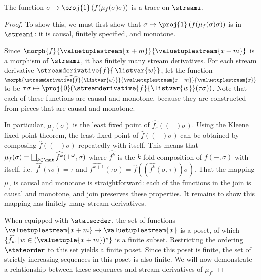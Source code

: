 \begin{proposition}
    The function \(\sigma \mapsto \proj{1}\left(f(\mu_f(\sigma)\sigma)\right)\)
    is a trace on \(\streami\).
\end{proposition}
\begin{proof}
    To show this, we must first show that
    \(\sigma \mapsto \proj{1}\left(f(\mu_f(\sigma)\sigma)\right)\) is in
    \(\streami\): it is causal, finitely specified, and monotone.

    Since \(
    \morph{f}{\valuetuplestream{x+m}}{\valuetuplestream{x+m}}
    \) is a morphism of \(\streami\), it has finitely many stream derivatives.
    For each stream derivative \(\streamderivative{f}{\,\listvar{w}}\), let the
    function \(
    \morph{
        \widehat{\streamderivative{f}{\listvar{w}}}
    }{
        \valuetuplestream{x+m}
    }{
        \valuetuplestream{x}
    }
    \) to be \(
    \tau\sigma
    \mapsto
    \proj{0}(\streamderivative{f}{\listvar{w}}(\tau\sigma))
    \).
    Note that each of these functions are causal and monotone, because they are
    constructed from pieces that are causal and monotone.

    In particular, \(\mu_f(\sigma)\) is the least fixed point of
    \(\widehat{f_\varepsilon}\left((-)\sigma\right)\).
    Using the Kleene fixed point theorem, the least fixed point of
    \(\widehat{f}((-)\sigma)\) can be obtained by composing
    \(\widehat{f}((-)\sigma)\) repeatedly with itself.
    This means that \(
    \mu_f(\sigma)
    =
    \bigsqcup_{k \in \nat} \widehat{f^k}(\bot^\omega,\sigma)
    \) where \(\widehat{f^k}\) is the \(k\)-fold composition of \(f(-,\sigma)\)
    with itself, i.e.\ \(\widehat{f^0}(\tau\sigma) = \tau\) and \(
    \widehat{f^{k+1}}(\tau\sigma)
    =
    \widehat{f}\left(\left(\widehat{f^{k}}(\sigma, \tau)\right)\sigma\right)
    \).
    That the mapping \(\mu_f\) is causal and monotone is
    straightforward: each of the functions in the join is causal and monotone,
    and join preserves these properties.
    It remains to show this mapping has finitely many stream derivatives.

    When equipped with \(\stateorder\), the set of functions
    \(\valuetuplestream{x+m} \to \valuetuplestream{x}\)
    is a poset, of which
    \(\{\widehat{f_w} \,|\, w \in (\valuetuple{x+m})^\star\}\)
    is a finite subset.
    Restricting the ordering \(\stateorder\) to this set yields a finite poset.
    Since this poset is finite, the set of strictly increasing sequences in this
    poset is also finite.
    We will now demonstrate a relationship between these sequences and stream
    derivatives of \(\mu_f\).


\end{proof}
